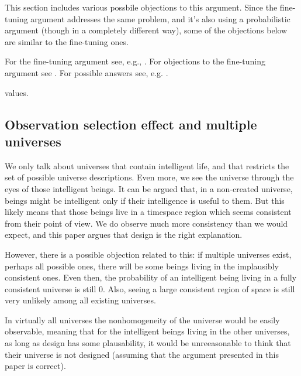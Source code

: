 \documentclass[a4paper
,draft
]{article}
\newcommand{\svn}[2][]{\todo[author=Virgil,color=red!25!white,#1]{#2}}
\newcommand{\paper}[1]{paper}
\newcommand{\ghilimele}[1]{``#1"}
\begin{document}
This section includes various possbile objections to this argument. Since the
fine-tuning argument addresses the same problem, and it's also using a
probabilistic argument (though in a completely different way), some of the
objections below are similar to the fine-tuning ones.

For the fine-tuning argument see, e.g., \svn{citations}. For objections to the
fine-tuning argument see
\parencites{Manson2003}{Manson2009}{McGrew2001}{Narveson2003}{Sober2009}.
For possible answers see, e.g.
\textcites{Leslie2003}{Swinburne2003}{Monton2006}{Kotzen2012}.

values.


\subsection{Observation selection effect and multiple universes}

We only talk about universes that contain intelligent life, and that restricts
the set of possible universe descriptions.
Even more, we see the universe through the eyes of those intelligent beings.
It can be argued that, in a non-created universe, beings might be intelligent
only if their intelligence is useful to them.
But this likely means that those beings live in a timespace region which seems
consistent from their point of view.
We do observe much more consistency than we would expect, and this \paper{}
argues that design is the right explanation.

However, there is a possible objection related to this: if multiple universes
exist, perhaps all possible ones, there will be some beings living in the
implausibly consistent ones.
Even then, the probability of an intelligent being living in a fully consistent
universe is still $0$.
Also, seeing a large consistent region of space is still very unlikely among
all existing universes.

In virtually all universes the nonhomogeneity of the universe would be
easily observable, meaning that for the intelligent beings living in the
other universes, as long as design has some plausability,
it would be unreeasonable to think that
their universe is not designed (assuming that the argument presented in
this \paper{} is correct).
\end{document}
